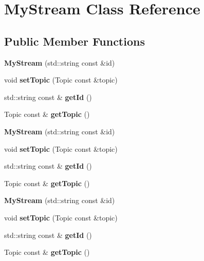 \section{My\+Stream Class Reference}
\label{class_my_stream}
\subsection*{Public Member Functions}
\begin{DoxyCompactItemize}
\item 
{\bfseries My\+Stream} (std\+::string const \&id)\label{class_my_stream_a0cb8c5084d6122efb669757eb3dc51df}

\item 
void {\bfseries set\+Topic} (Topic const \&topic)\label{class_my_stream_a7b043c20b59a3350d2b110fe513d27f9}

\item 
std\+::string const \& {\bfseries get\+Id} ()\label{class_my_stream_a08446154f53d9d882d2c24eee4187fca}

\item 
Topic const \& {\bfseries get\+Topic} ()\label{class_my_stream_a46fec149b460ceffffdd82b2a8f2e38c}

\item 
{\bfseries My\+Stream} (std\+::string const \&id)\label{class_my_stream_a0cb8c5084d6122efb669757eb3dc51df}

\item 
void {\bfseries set\+Topic} (Topic const \&topic)\label{class_my_stream_a7b043c20b59a3350d2b110fe513d27f9}

\item 
std\+::string const \& {\bfseries get\+Id} ()\label{class_my_stream_a08446154f53d9d882d2c24eee4187fca}

\item 
Topic const \& {\bfseries get\+Topic} ()\label{class_my_stream_a46fec149b460ceffffdd82b2a8f2e38c}

\item 
{\bfseries My\+Stream} (std\+::string const \&id)\label{class_my_stream_a0cb8c5084d6122efb669757eb3dc51df}

\item 
void {\bfseries set\+Topic} (Topic const \&topic)\label{class_my_stream_a7b043c20b59a3350d2b110fe513d27f9}

\item 
std\+::string const \& {\bfseries get\+Id} ()\label{class_my_stream_a08446154f53d9d882d2c24eee4187fca}

\item 
Topic const \& {\bfseries get\+Topic} ()\label{class_my_stream_a46fec149b460ceffffdd82b2a8f2e38c}

\end{DoxyCompactItemize}


